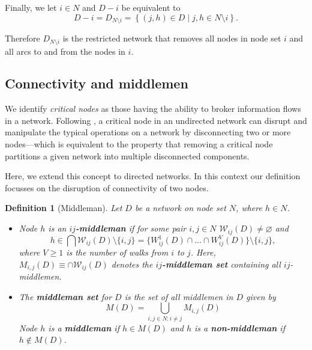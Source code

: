 \documentclass[11pt,fleqn]{article}
\newtheorem{definition}[theorem]{Definition}
\begin{document}
Finally, we let $i \in N$ and $D-i$ be equivalent to
\begin{equation}
D - i = D_{N \setminus i} = \left\{ (j,h) \in D \mid j,h \in N \setminus i \right\} .
\end{equation}

Therefore $D_{N \setminus i}$ is the restricted network that removes all nodes in node set $i$ and all arcs to and from the nodes in $i$.

\subsection{Connectivity and middlemen}

We identify \textit{critical nodes} as those having the ability to broker information flows in a network. Following \citet{GillesChakrabarti2006}, a critical node in an undirected network can disrupt and manipulate the typical operations on a network by disconnecting two or more nodes---which is equivalent to the property that removing a critical node partitions a given network into multiple disconnected components.

Here, we extend this concept to directed networks. In this context our definition focusses on the disruption of connectivity of two nodes.

\begin{definition}[Middleman] \label{middleman}
Let $D$ be a network on node set $N$, where $h \in N$.
\begin{itemize}
\item Node $h$ is an \textbf{$ij$-middleman} if for some pair $i,j \in N$ $\mathcal{W}_{ij} (D) \neq \varnothing$ and
\begin{equation} \label{ijmiddleman}
h \in \bigcap \mathcal{W}_{ij}(D) \setminus \{i,j\} = \{W_{ij}^{1}(D) \cap  \ldots  \cap W_{ij}^{V}(D)\} \setminus \{i,j\},
\end{equation}
where $V \geqslant 1$ is the number of walks from $i$ to $j$. Here, $M_{i,j}(D) \equiv \cap \mathcal{W}_{ij}(D)$ denotes the \textbf{$ij$-middleman set} containing all $ij$-middlemen.

\item The \textbf{middleman set} for $D$ is the set of all middlemen in $D$ given by
\begin{equation} \label{middlemanseteq}
M(D) = \bigcup_{i,j \in N \colon i \neq j} M_{i,j}(D)
\end{equation}
Node $h$ is a \textbf{middleman} if $h \in M(D)$ and $h$ is a \textbf{non-middleman} if $h \notin M(D)$.
\end{itemize}
\end{definition}
\end{document}
